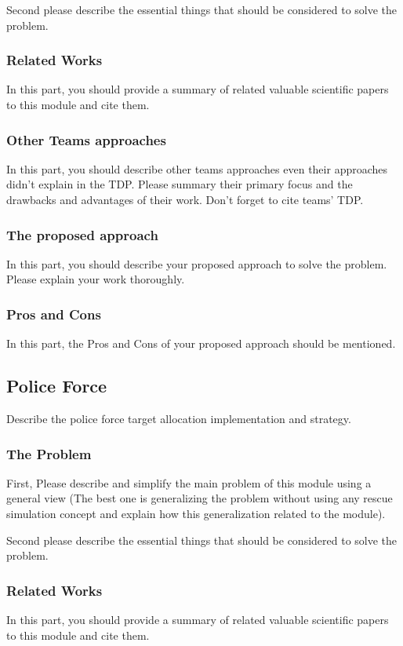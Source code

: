 \documentclass[runningheads,a4paper]{llncs}
\begin{document}
Second please describe the essential things that should be considered to solve the problem.
\subsubsection{Related Works}
In this part, you should provide a summary of related valuable scientific papers to this module and cite them.
\subsubsection{Other Teams approaches}
In this part, you should describe other teams approaches even their approaches didn't explain in the TDP. Please summary their primary focus and the drawbacks and advantages of their work. Don't forget to cite teams' TDP.
\subsubsection{The proposed approach}
In this part, you should describe your proposed approach to solve the problem. Please explain your work thoroughly.
\subsubsection{Pros and Cons}
In this part, the Pros and Cons of your proposed approach should be mentioned.

\subsection{Police Force}
Describe the police force target allocation implementation and strategy.
\subsubsection{The Problem}
First, Please describe and simplify the main problem of this module using a general view (The best one is generalizing the problem without using any rescue simulation concept and explain how this generalization related to the module).

Second please describe the essential things that should be considered to solve the problem.
\subsubsection{Related Works}
In this part, you should provide a summary of related valuable scientific papers to this module and cite them.
\end{document}

